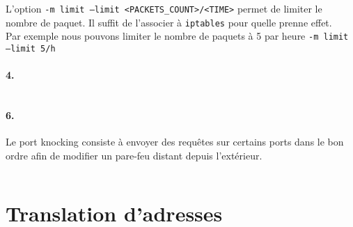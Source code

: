 L'option \texttt{-m limit --limit <PACKETS_COUNT>/<TIME>} permet de limiter le nombre de paquet. Il suffit de l'associer à \texttt{iptables} pour quelle prenne effet.\\
Par exemple nous pouvons limiter le nombre de paquets à 5 par heure  \texttt{-m limit --limit 5/h}

\paragraph{4.}

\inputminted[linenos]{bash}{../sources/TP5/tp5-ex3-5.sh}

\paragraph{6.}
Le port knocking consiste à envoyer des requêtes sur certains ports dans le bon ordre afin de modifier un pare-feu distant depuis l'extérieur.

\inputminted[linenos]{bash}{../sources/TP5/tp5-ex3-7.sh}

\section{Translation d'adresses}
